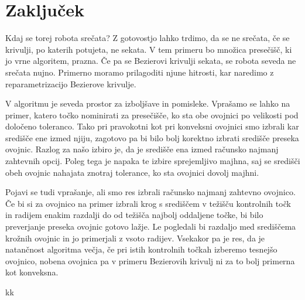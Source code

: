 \documentclass[a4paper, 12pt]{article} %
\begin{document}
\section{Zaključek}

Kdaj se torej robota srečata? Z gotovostjo lahko trdimo, da se ne srečata, če se krivulji, po katerih potujeta, ne sekata. V tem primeru bo množica presečišč, ki jo vrne algoritem, prazna. Če pa se Bezierovi krivulji sekata, se robota seveda ne srečata nujno. Primerno moramo prilagoditi njune hitrosti, kar naredimo z reparametrizacijo Bezierove krivulje.

V algoritmu je seveda prostor za izboljšave in pomisleke. Vprašamo se lahko na primer, katero točko nominirati za presečišče, ko sta obe ovojnici po velikosti pod določeno toleranco. Tako pri pravokotni kot pri konveksni ovojnici smo izbrali kar središče ene izmed njiju, zagotovo pa bi bilo bolj korektno izbrati središče preseka ovojnic. Razlog za našo izbiro je, da je središče ena izmed računsko najmanj zahtevnih opcij. Poleg tega je napaka te izbire sprejemljivo majhna, saj se središči obeh ovojnic nahajata znotraj tolerance, ko sta ovojnici dovolj majhni.

Pojavi se tudi vprašanje, ali smo res izbrali računsko najmanj zahtevno ovojnico. Če bi si za ovojnico na primer izbrali krog s središčem v težišču kontrolnih točk in radijem enakim razdalji do od težišča najbolj oddaljene točke, bi bilo preverjanje preseka ovojnic gotovo lažje. Le pogledali bi razdaljo med središčema krožnih ovojnic in jo primerjali z vsoto radijev.
Vsekakor pa je res, da je natančnost algoritma večja, če pri istih kontrolnih točkah izberemo tesnejšo ovojnico, nobena ovojnica pa v primeru Bezierovih krivulj ni za to bolj primerna kot konveksna.

\begin{thebibliography}{9}
 kk
\end{thebibliography}
\end{document}
